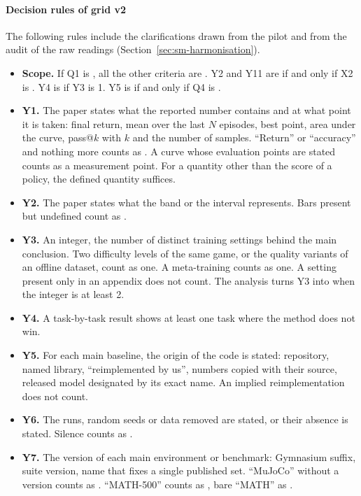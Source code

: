 \paragraph{Decision rules of grid v2}
The following rules include the clarifications drawn from the pilot and from the audit of the raw
readings (Section~\ref{sec:sm-harmonisation}).
\begin{itemize}
  \item \textbf{Scope.} If Q1 is , all the other criteria are . Y2 and Y11 are
   if and only if X2 is . Y4 is  if Y3 is 1. Y5 is  if and only if
  Q4 is .
  \item \textbf{Y1.} The paper states what the reported number contains and at what point it is
  taken: final return, mean over the last $N$ episodes, best point, area under the curve, pass@$k$
  with $k$ and the number of samples. \enquote{Return} or \enquote{accuracy} and nothing more counts as
  . A curve whose evaluation points are stated counts as a measurement point. For a quantity
  other than the score of a policy, the defined quantity suffices.
  \item \textbf{Y2.} The paper states what the band or the interval represents. Bars present but
  undefined count as .
  \item \textbf{Y3.} An integer, the number of distinct training settings behind the main conclusion.
  Two difficulty levels of the same game, or the quality variants of an offline dataset, count as one.
  A meta-training counts as one. A setting present only in an appendix does not count. The analysis
  turns Y3 into  when the integer is at least 2.
  \item \textbf{Y4.} A task-by-task result shows at least one task where the method does not win.
  \item \textbf{Y5.} For each main baseline, the origin of the code is stated: repository, named
  library, \enquote{reimplemented by us}, numbers copied with their source, released model designated
  by its exact name. An implied reimplementation does not count.
  \item \textbf{Y6.} The runs, random seeds or data removed are stated, or their absence is stated.
  Silence counts as .
  \item \textbf{Y7.} The version of each main environment or benchmark: Gymnasium suffix, suite
  version, name that fixes a single published set. \enquote{MuJoCo} without a version counts as
  . \enquote{MATH-500} counts as , bare \enquote{MATH} as .

\end{itemize}
